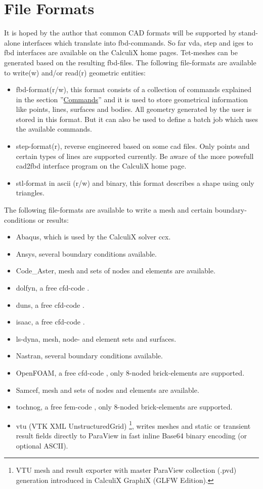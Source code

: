 \documentclass{article}
\providecommand{\htmlref}[2]{\hyperref[#2]{#1}}
\begin{document}
\section{\label{File Formats}File Formats}
It is hoped by the author that common CAD formats will be supported by stand-alone interfaces which translate into fbd-commands. So far vda, step and iges to fbd interfaces are available on the CalculiX home pages. Tet-meshes can be generated based on the resulting fbd-files. The following file-formats are available to write(w) and/or read(r) geometric entities:
\begin{itemize}
\item fbd-format(r/w), this format consists of a collection of commands explained in the section ''\htmlref{Commands}{Commands}'' and it is used to store geometrical information like points, lines, surfaces and bodies. All geometry generated by the user is stored in this format. But it can also be used to define a batch job which uses the available commands.
\item step-format(r), reverse engineered based on some cad files. Only points and certain types of lines are supported currently. Be aware of the more powefull cad2fbd interface program on the CalculiX home page.
\item stl-format in ascii (r/w) and binary, this format describes a shape using only triangles.
\end{itemize}
The following file-formats are available to write a mesh and certain boundary-conditions or results:
\begin{itemize}
\item Abaqus, which is used by the CalculiX solver ccx.
\item Ansys, several boundary conditions available.
\item Code\_Aster, mesh and sets of nodes and elements are available.
\item dolfyn, a free cfd-code \cite{dolfyn}.
\item duns, a free cfd-code \cite{duns}.
\item isaac, a free cfd-code \cite{isaac}.
\item ls-dyna, mesh, node- and element sets and surfaces.
\item Nastran, several boundary conditions available.
\item OpenFOAM, a free cfd-code \cite{OpenFOAM}, only 8-noded brick-elements are supported.
\item Samcef, mesh and sets of nodes and elements are available.
\item tochnog, a free fem-code \cite{tochnog}, only 8-noded brick-elements are supported.
\item vtu (VTK XML UnstructuredGrid) \cite{paraview}\footnote{VTU mesh and result exporter with master ParaView collection (.pvd) generation introduced in CalculiX GraphiX (GLFW Edition).}, writes meshes and static or transient result fields directly to ParaView in fast inline Base64 binary encoding (or optional ASCII).
\end{itemize}
\end{document}
